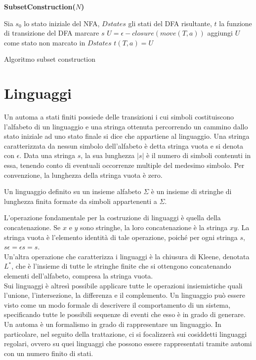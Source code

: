 \begin{algorithm}
\textbf{SubsetConstruction($N$)}
\begin{algorithmic}
\STATE Sia $s_0$ lo stato iniziale del NFA, $Dstates$ gli stati del DFA risultante, $t$ la funzione di transizione del DFA
	\STATE marcare $s$
		\STATE $U = \epsilon-closure(move(T,a))$
			\STATE aggiungi $U$ come stato non marcato in $Dstates$
		\ENDIF
		\STATE $t(T,a) = U$
	\ENDFOR
\ENDWHILE
\end{algorithmic}
\caption{Algoritmo subset construction}
\label{alg:subset}
\end{algorithm}

\newpage
\section{Linguaggi}
Un automa a stati finiti possiede delle transizioni i cui simboli costituiscono l'alfabeto di un linguaggio e una stringa ottenuta percorrendo un cammino dallo stato iniziale ad uno stato finale si dice che appartiene al linguaggio. Una stringa caratterizzata da nessun simbolo dell'alfabeto è detta stringa vuota e si denota con $\epsilon$.
Data una stringa $s$, la sua lunghezza $|s|$ è il numero di simboli contenuti in essa, tenendo conto di eventuali occorrenze multiple del medesimo simbolo. Per convenzione, la lunghezza della stringa vuota è zero.
\begin{defn}
Un linguaggio definito su un insieme alfabeto $\Sigma$ è un insieme di stringhe di lunghezza finita formate da simboli appartenenti a $\Sigma$.
\end{defn}
L'operazione fondamentale per la costruzione di linguaggi è quella della concatenazione. Se $x$ e $y$ sono stringhe, la loro concatenazione è la stringa $xy$. La stringa vuota è l'elemento identità di tale operazione, poiché per ogni stringa $s$, $s\epsilon = \epsilon s = s$.\\
Un'altra operazione che caratterizza i linguaggi è la chiusura di Kleene, denotata $L^*$, che è l'insieme di tutte le stringhe finite che si ottengono concatenando elementi dell'alfabeto, compresa la stringa vuota.\\
Sui linguaggi è altresì possibile applicare tutte le operazioni insiemistiche quali l'unione, l'intersezione, la differenza e il complemento.
Un linguaggio può essere visto come un modo formale di descrivere il comportamento di un sistema, specificando tutte le possibili sequenze di eventi che esso è in grado di generare. 
Un automa è un formalismo in grado di rappresentare un linguaggio.
In particolare, nel seguito della trattazione, ci si focalizzerà sui cosiddetti linguaggi regolari, ovvero su quei linguaggi che possono essere rappresentati tramite automi con un numero finito di stati.

